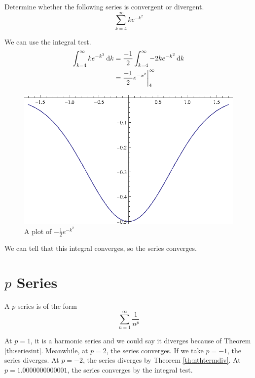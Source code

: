 \begin{ex}
  Determine whether the following series is convergent or divergent.
  \[ \sum_{k=4}^\infty k e^{-k^2} \]
  \begin{sol}
    We can use the integral test.
    \begin{align*}
      \int_{k=4}^\infty k e^{-k^2} \,\mathrm{d} k
      &=\frac{-1}{2}\int_{k=4}^\infty -2 k e^{-k^2} \,\mathrm{d} k \\
      &=\frac{-1}{2}e^{-x^2} \bigg|_4^\infty
    \end{align*}
    \begin{figure}[H]
      \begin{center}
        \includegraphics[scale=0.8]{continuous/series/henxs.eps}
      \end{center}
      \caption{A plot of $-\frac{1}{2}e^{-k^2}$}
      \label{fig:henxs}
    \end{figure}
    We can tell that this integral converges, so the series converges.
  \end{sol}
\end{ex}

\section{$p$ Series}
\label{sec:pseries}

A \(p\) series is of the form
\[ \sum_{n=1}^{\infty} \frac{1}{n^p} \]

At \(p=1\), it is a harmonic series and we could say it diverges because of Theorem \ref{th:seriesint}.
Meanwhile, at \(p=2\), the series converges.
If we take \(p=-1\), the series diverges.
At \(p=-2\), the series diverges by Theorem \ref{th:nthtermdiv}.
At \(p=1.0000000000001\), the series converges by the integral test.

